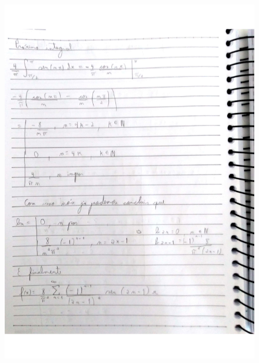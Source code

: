 \documentclass[a4paper]{article}
\begin{document}
        \begin{figure}{\textwidth}
            \centering
            \includegraphics[width=\textwidth]{Questoes-1-3_page-0012.jpg}
        \end{figure}
\end{document}
